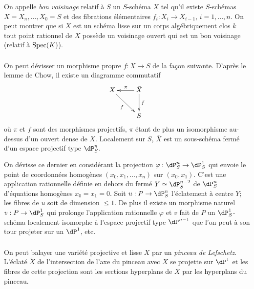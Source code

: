 On appelle \emph{bon voisinage} relatif à $S$ un $S$-schéma $X$ tel qu'il 
existe $S$-schémas $X=X_n,\dotsc,X_0=S$ et des fibrations élémentaires 
$f_i:X_i\to X_{i-1}$, $i=1,\dotsc,n$. On peut montrer \cite[XI 3.3]{sga4} que si 
$X$ est un schéma lisse sur un corps algébriquement clos $k$ tout point 
rationnel de $X$ possède un voisinage ouvert qui est un bon voisinage 
(relatif à $\operatorname{Spec}(K)$). 





\subsubsection{}\label{I:3-4-3}

On peut dévisser un morphisme propre $f:X\to S$ de la façon suivante. 
D'après le lemme de Chow, il existe un diagramme commutatif
\[\xymatrix{
  X \ar[dr]_-f 
    & \ar[l]_-\pi \ar[d]^-{\bar f} \bar X \\
  & S
}\]
où $\pi$ et $\bar f$ sont des morphismes projectifs, $\pi$ étant de plus un 
isomorphisme au-dessus d'un ouvert dense de $X$. Localement sur $S$, $\bar X$ 
est un sous-schéma fermé d'un espace projectif type $\dP_S^n$. 

On dévisse ce dernier en considérant la projection 
$\varphi:\dP_S^n\to\dP_S^1$ qui envoie le point de coordonnées homogènes 
$(x_0,x_1,\dotsc,x_n)$ sur $(x_0,x_1)$. C'est une application rationnelle 
définie en dehors du fermé $Y\simeq \dP_S^{n-2}$ de $\dP_S^n$ d'équations 
homogènes $x_0=x_1=0$. Soit $u:P\to \dP_S^n$ l'éclatement à centre 
$Y$; les fibres de $u$ soit de dimension $\leqslant 1$. De plus il existe un 
morphisme naturel $v:P\to \dP_S^1$ qui prolonge l'application rationnelle 
$\varphi$ et $v$ fait de $P$ un $\dP_S^1$-schéma localement isomorphe à 
l'espace projectif type $\dP^{n-1}$ que l'on peut à son tour projeter sur un 
$\dP^1$, etc. 





\subsubsection{}\label{I:3-4-4}

On peut balayer une variété projective et lisse $X$ par un \emph{pinceau de 
Lefschetz}. L'éclaté $\widetilde X$ de l'intersection de l'axe du pinceau 
avec $X$ se projette sur $\dP^1$ et les fibres de cette projection sont les 
sections hyperplans de $X$ par les hyperplans du pinceau.




















